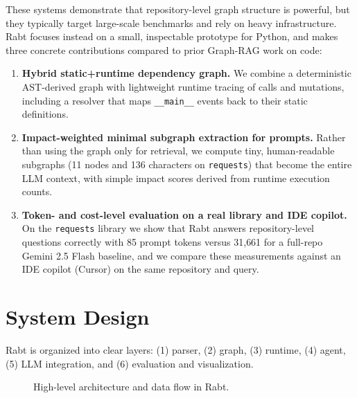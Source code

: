 \documentclass[11pt]{article}
\begin{document}
These systems demonstrate that repository-level graph structure is powerful, but they typically target large-scale benchmarks and rely on heavy infrastructure.
Rabt focuses instead on a small, inspectable prototype for Python, and makes three concrete contributions compared to prior Graph-RAG work on code:
\begin{enumerate}
  \item \textbf{Hybrid static+runtime dependency graph.} We combine a deterministic AST-derived graph with lightweight runtime tracing of calls and mutations, including a resolver that maps \texttt{\_\_main\_\_} events back to their static definitions.
  \item \textbf{Impact-weighted minimal subgraph extraction for prompts.} Rather than using the graph only for retrieval, we compute tiny, human-readable subgraphs (11 nodes and 136 characters on \texttt{requests}) that become the entire LLM context, with simple impact scores derived from runtime execution counts.
  \item \textbf{Token- and cost-level evaluation on a real library and IDE copilot.} On the \texttt{requests} library we show that Rabt answers repository-level questions correctly with 85 prompt tokens versus 31{,}661 for a full-repo Gemini 2.5 Flash baseline, and we compare these measurements against an IDE copilot (Cursor) on the same repository and query.
\end{enumerate}

\section{System Design}

Rabt is organized into clear layers:
(1) parser, (2) graph, (3) runtime, (4) agent, (5) LLM integration, and (6) evaluation and visualization.

\begin{figure}[t]
  \centering
  \caption{High-level architecture and data flow in Rabt.}
  \label{fig:architecture}
\end{figure}
\end{document}
